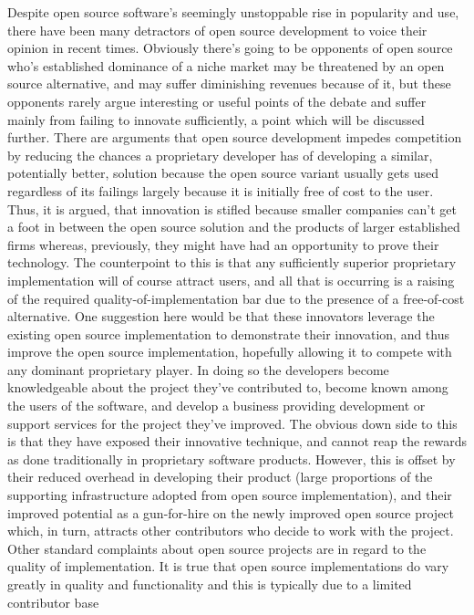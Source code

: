 Despite open source software’s seemingly unstoppable rise in popularity and
use, there have been many detractors of open source development to voice their
opinion in recent times. Obviously there’s going to be opponents of open source
who’s established dominance of a niche market may be threatened by an open source
alternative, and may suffer diminishing revenues because of it, but these opponents
rarely argue interesting or useful points of the debate and suffer mainly from failing
to innovate sufficiently, a point which will be discussed further.
There are arguments that open source development impedes competition by reducing
the chances a proprietary developer has of developing a similar, potentially
better, solution because the open source variant usually gets used regardless of its
failings largely because it is initially free of cost to the user. Thus, it is argued, that
innovation is stifled because smaller companies can’t get a foot in between the open
source solution and the products of larger established firms whereas, previously, they
might have had an opportunity to prove their technology. The counterpoint to this
is that any sufficiently superior proprietary implementation will of course attract
users, and all that is occurring is a raising of the required quality-of-implementation
bar due to the presence of a free-of-cost alternative. One suggestion here would be
that these innovators leverage the existing open source implementation to demonstrate
their innovation, and thus improve the open source implementation, hopefully
allowing it to compete with any dominant proprietary player. In doing so the developers
become knowledgeable about the project they’ve contributed to, become
known among the users of the software, and develop a business providing development
or support services for the project they’ve improved. The obvious down side
to this is that they have exposed their innovative technique, and cannot reap the
rewards as done traditionally in proprietary software products. However, this is
offset by their reduced overhead in developing their product (large proportions of
the supporting infrastructure adopted from open source implementation), and their
improved potential as a gun-for-hire on the newly improved open source project
which, in turn, attracts other contributors who decide to work with the project.
Other standard complaints about open source projects are in regard to the quality
of implementation. It is true that open source implementations do vary greatly
in quality and functionality and this is typically due to a limited contributor base
